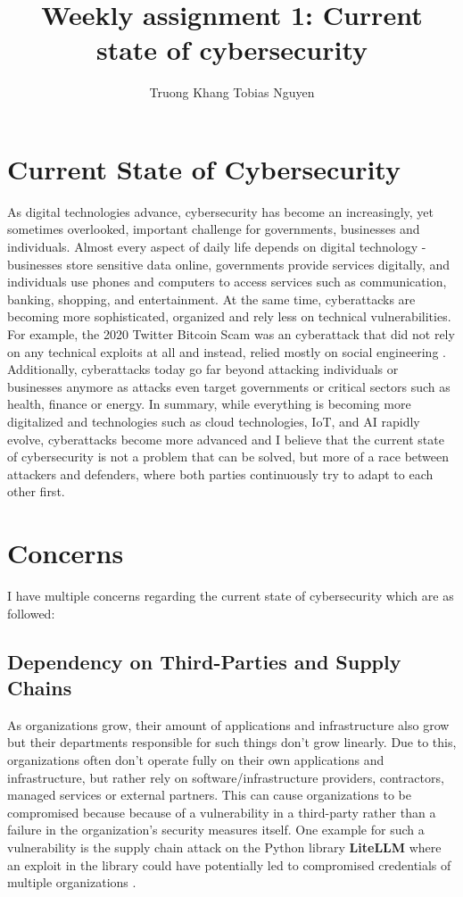 \documentclass[12pt]{article}
\title{Weekly assignment 1: Current state of cybersecurity}
\author{Truong Khang Tobias Nguyen}
\date{}
\begin{document}
\maketitle

\section{Current State of Cybersecurity}
As digital technologies advance, cybersecurity has become an increasingly, yet sometimes overlooked, important challenge for governments, businesses and individuals.
\newline 
Almost every aspect of daily life depends on digital technology - businesses store sensitive data online, governments provide services digitally, and individuals use phones and computers to access services such as communication, banking, shopping, and entertainment.
\newline
At the same time, cyberattacks are becoming more sophisticated, organized and rely less on technical vulnerabilities. For example, the 2020 Twitter Bitcoin Scam was an cyberattack that did not rely on any technical exploits at all and instead, relied mostly on social engineering \cite{twitterhack}. Additionally, cyberattacks today go far beyond attacking individuals or businesses anymore as attacks even target governments or critical sectors such as health, finance or energy.
\newline
In summary, while everything is becoming more digitalized and technologies such as cloud technologies, IoT, and AI rapidly evolve, cyberattacks become more advanced and I believe that the current state of cybersecurity is not a problem that can be solved, but more of a race between attackers and defenders, where both parties continuously try to adapt to each other first.

\section{Concerns}
I have multiple concerns regarding the current state of cybersecurity which are as followed:
\subsection{Dependency on Third-Parties and Supply Chains}
As organizations grow, their amount of applications and infrastructure also grow but their departments responsible for such things don't grow linearly. Due to this, organizations often don't operate fully on their own applications and infrastructure, but rather rely on software/infrastructure providers, contractors, managed services or external partners.
\newline
This can cause organizations to be compromised because because of a vulnerability in a third-party rather than a failure in the organization's security measures itself. One example for such a vulnerability is the supply chain attack on the Python library \textbf{LiteLLM} where an exploit in the library could have potentially led to compromised credentials of multiple organizations \cite{litellm}.     
\end{document}
